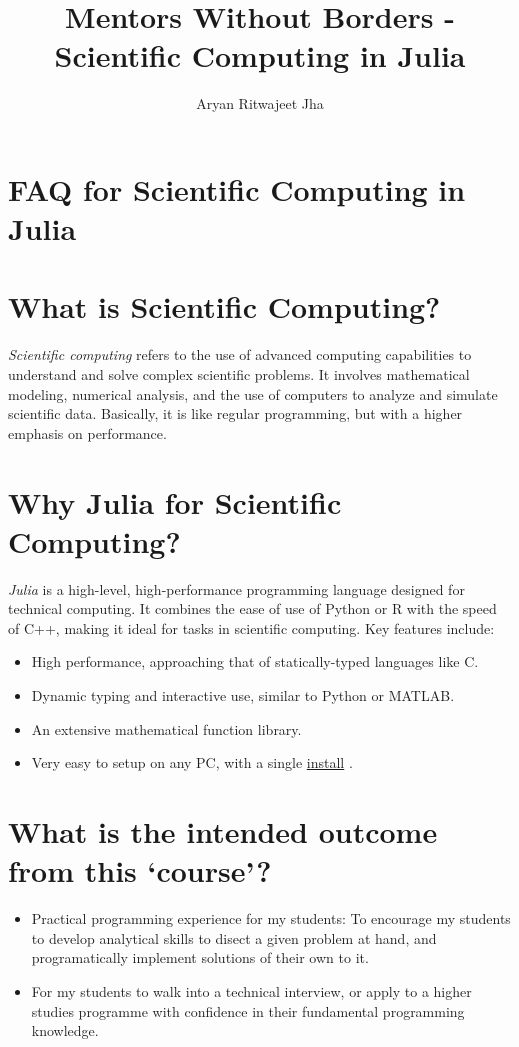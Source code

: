 \documentclass{article}
\title{Mentors Without Borders - Scientific Computing in Julia}
\author{Aryan Ritwajeet Jha}
\date{}
\begin{document}
\maketitle

\section*{FAQ for Scientific Computing in Julia}

\section{What is Scientific Computing?}
\textit{Scientific computing} refers to the use of advanced computing capabilities to understand and solve complex scientific problems. It involves mathematical modeling, numerical analysis, and the use of computers to analyze and simulate scientific data. Basically, it is like regular programming, but with a higher emphasis on performance.

\section{Why Julia for Scientific Computing?}
\textit{Julia} is a high-level, high-performance programming language designed for technical computing. It combines the ease of use of Python or R with the speed of C++, making it ideal for tasks in scientific computing. Key features include:
\begin{itemize}
    \item High performance, approaching that of statically-typed languages like C.
    \item Dynamic typing and interactive use, similar to Python or MATLAB.
    \item An extensive mathematical function library.
    \item Very easy to setup on any PC, with a single \href{https://julialang-s3.julialang.org/bin/winnt/x64/1.9/julia-1.9.4-win64.exe}{install} .
\end{itemize}

\section{What is the intended outcome from this `course'?}
\begin{itemize}
    \item Practical programming experience for my students: To encourage my students to develop analytical skills to disect a given problem at hand, and programatically implement solutions of their own to it.
    \item For my students to walk into a technical interview, or apply to a higher studies programme with confidence in their fundamental programming knowledge.
\end{itemize}
\end{document}

